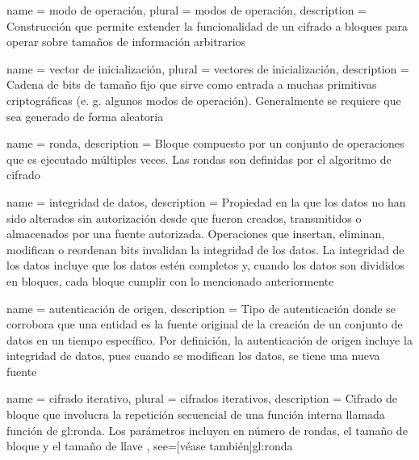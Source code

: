 %
%
%

\makeglossaries

{
  name = modo de operación,
  plural = modos de operación,
  description = {
    Construcción que permite extender la funcionalidad de un cifrado a bloques
    para operar sobre tamaños de información arbitrarios%
  }
}

{
  name = vector de inicialización,
  plural = vectores de inicialización,
  description = {
    Cadena de bits de tamaño fijo que sirve como entrada a muchas primitivas
    criptográficas (e. g. algunos modos de operación). Generalmente se requiere
    que sea generado de forma aleatoria%
  }
}

{
  name = ronda,
  description = {
    Bloque compuesto por un conjunto de operaciones que es ejecutado
    múltiples veces. Las rondas son definidas por el algoritmo de cifrado%
  }
}

{
  name = integridad de datos,
  description = {
    Propiedad en la que los datos no han sido alterados sin autorización desde
    que fueron creados, transmitidos o almacenados por una fuente autorizada.
    Operaciones que insertan, eliminan, modifican o reordenan bits invalidan
    la integridad de los datos. La integridad de los datos incluye que los
    datos estén completos y, cuando los datos son divididos en bloques, cada
    bloque cumplir con lo mencionado anteriormente%
  }
}

{
  name = autenticación de origen,
  description = {
    Tipo de autenticación donde se corrobora que una entidad es la fuente
    original de la creación de un conjunto de datos en un tiempo específico.
    Por definición, la autenticación de origen incluye la integridad de datos,
    pues cuando se modifican los datos, se tiene una nueva fuente%
  }
}

{
  name = cifrado iterativo,
  plural = cifrados iterativos,
  description = {
    Cifrado de bloque que involucra la repetición secuencial de
    una función interna llamada función de \gls{gl:ronda}. Los
    parámetros incluyen en número de rondas, el tamaño de bloque y
    el tamaño de llave%
  },
  see=[véase también]{gl:ronda}
}

